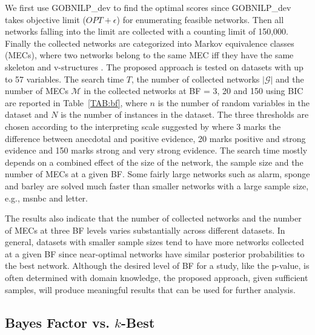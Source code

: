 \documentclass[letterpaper]{article}
\newcommand{\opt}{\mathit{OPT}}
\newcommand{\graphset}{\mathcal{G}}
\begin{document}
We first use GOBNILP\_dev to find the optimal scores since GOBNILP\_dev takes objective limit ($\opt + \epsilon$) for enumerating feasible networks. Then all networks falling into the limit are collected with a counting limit of 150,000. Finally the collected networks are categorized into Markov equivalence classes (MECs), where two networks belong to the same MEC iff they have the same skeleton and v-structures \cite{VermaP1990}. The proposed approach is tested on datasets with up to 57 variables. The search time $T$, the number of collected networks $|\graphset|$ and the number of MECs $\mathcal{M}$ in the collected networks at BF = 3, 20 and 150 using BIC are reported in Table~\ref{TAB:bf}, where $n$ is the number of random variables in the dataset and $N$ is the number of instances in the dataset. The three thresholds are chosen according to the interpreting scale suggested by \cite{HeckermanGC95} where 3 marks the difference between anecdotal and positive evidence, 20 marks positive and strong evidence and 150 marks strong and very strong evidence. The search time mostly depends on a combined effect of the size of the network, the sample size and the number of MECs at a given BF. Some fairly large networks such as alarm, sponge and barley are solved much faster than smaller networks with a large sample size, e.g., msnbc and letter.

The results also indicate that the number of collected networks and the number of MECs at three BF levels varies substantially across different datasets. In general, datasets with smaller sample sizes tend to have more networks collected at a given BF since near-optimal networks have similar posterior probabilities to the best network. Although the desired level of BF for a study, like the p-value, is often determined with domain knowledge, the proposed approach, given sufficient samples, will produce meaningful results that can be used for further analysis.


\subsection{Bayes Factor vs. $k$-Best}
\end{document}
